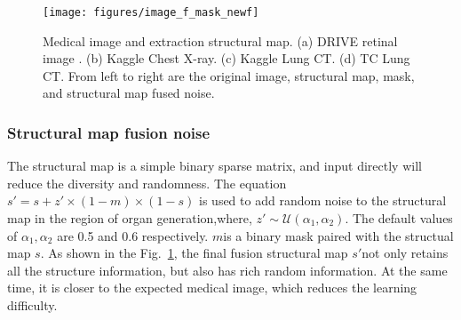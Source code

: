 \documentclass[runningheads]{llncs}
\begin{document}
	\begin{figure}[thbp!]
		\centering
		\texttt{[image: figures/image\_f\_mask\_newf]}
		\caption{Medical image and extraction structural map. (a) DRIVE retinal image . (b) Kaggle Chest X-ray. (c) Kaggle Lung CT. (d) TC Lung CT. From left to right are the original image, structural map, mask, and structural map fused noise.}
		\label{image_and_f}
	\end{figure}	
	\subsubsection{Structural map fusion noise}	
	The structural map is a simple binary sparse matrix, and input directly will reduce the diversity and randomness. The equation $s'=s+z'\times(1-m)\times(1-s)$ is used to add random noise to the structural map in the region of organ generation,where, $z'\sim\mathcal{U}(\alpha_1,\alpha_2)$. The default values of $\alpha_1,\alpha_2$ are 0.5 and 0.6 respectively. $m$is a binary mask paired with the structual map $s$. As shown in the Fig.~\ref{image_and_f}, the final fusion structural map $s'$not only retains all the structure information, but also has rich random information. At the same time, it is closer to the expected medical image, which reduces the learning difficulty. 
\end{document}
